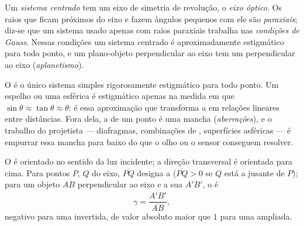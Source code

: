 \begin{definition}\label{def:b1:mirrors-thin-lenses:gauss}
Um \emph{sistema centrado} tem um eixo de simetria de revolução, o
\emph{eixo óptico}. Os raios que ficam próximos do eixo e fazem ângulos
pequenos com ele são \emph{paraxiais}; diz-se que um sistema usado apenas com
raios paraxiais trabalha nas \emph{condições de Gauss}. Nessas
condições um sistema centrado é aproximadamente estigmático para todo
ponto, e um plano-objeto perpendicular ao eixo tem um 
perpendicular ao eixo (\emph{aplanetismo}).
\end{definition}
\admitted

\begin{remark}\label{rem:b1:mirrors-thin-lenses:why}
O  é o único sistema simples rigorosamente
estigmático para todo ponto. Um espelho ou uma  esférica é estigmático
apenas na medida em que $\sin\theta \approx \tan\theta \approx \theta$:
é essa aproximação que transforma a  em relações lineares
entre distâncias. Fora dela, a  de um ponto é uma mancha
(\emph{aberrações}), e o trabalho do projetista --- diafragmas, combinações de
, superfícies asféricas --- é empurrar essa mancha para baixo do que o olho ou
o sensor conseguem resolver.
\end{remark}

\begin{notation}\label{not:b1:mirrors-thin-lenses:signs}
O  é orientado no sentido da luz incidente;
a direção transversal é orientada para cima. Para pontos $P$, $Q$ do
eixo, $\overline{PQ}$ designa a  ($\overline{PQ} > 0$
se $Q$ está a jusante de $P$); para um objeto $AB$ perpendicular ao
eixo e a sua  $A'B'$, o \emph{} é
\[
\gamma = \frac{\overline{A'B'}}{\overline{AB}} ,
\]
negativo para uma  invertida, de valor absoluto maior que $1$ para uma
 ampliada.
\end{notation}

